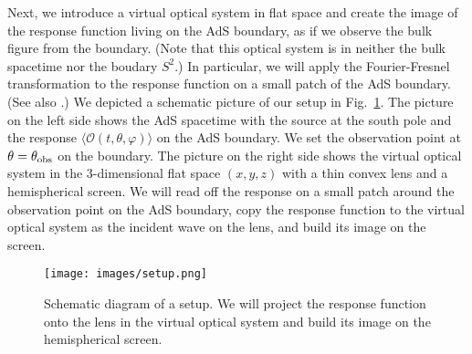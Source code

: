 \documentclass[a4paper,11pt]{article}
\begin{document}
    Next, we introduce a virtual optical system in flat space and create the image of the response function living on the AdS boundary, as if we observe the bulk figure from the boundary. (Note that this optical system is in neither the bulk spacetime nor the boudary $S^2$.) In particular, we will apply the Fourier-Fresnel transformation to the response function on a small patch of the AdS boundary. (See also \cite{Nambu2013,Kanai2013,Nambu2016}.)
    We depicted a schematic picture of our setup in Fig.~\ref{fig:AdS_boundary}. The picture on the left side shows the AdS spacetime with the source at the south pole and the response $\langle \mathcal{O}(t,\theta,\varphi) \rangle$ on the AdS boundary. We set the observation point at $\theta=\theta_{\rm{obs}}$ on the boundary. The picture on the right side shows the virtual optical system in the 3-dimensional flat space $(x,y,z)$ with a thin convex lens and a hemispherical screen. We will read off the response on a small patch around the observation point on the AdS boundary, copy the response function to the virtual optical system as the incident wave on the lens, and build its image on the screen.
    \begin{figure}[ht]
        \centering
        \texttt{[image: images/setup.png]}
        \caption{Schematic diagram of a setup. 
        We will project the response function onto the lens in the virtual optical system and build its image on the hemispherical screen.}
        \label{fig:AdS_boundary}
    \end{figure}
    
\end{document}
